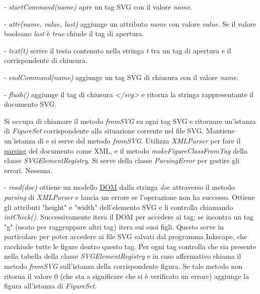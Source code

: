 \begin{elencopuntato}[\subsubsecindent]
\item[-]  \textit{startCommand(name)} apre un tag SVG con il valore \textit{name}. 
\item[-]  \textit{attr(name, value, last)} aggiunge un attributo \textit{name} con valore \textit{value}. Se il valore booleano \textit{last} \`e \textit{true} chiude il tag di apertura.
\item[-]  \textit{text(t)} scrive il testo contenuto nella stringa \textit{t} tra un tag di apertura e il corrispondente di chiusura.
\item[-]  \textit{endCommand(name)} aggiunge un tag SVG di chiusura con il valore \textit{name}.
\item[-]  \textit{flush()} aggiunge il tag di chiusura \textit{</svg>} e ritorna la stringa rappresentante il documento SVG.
\end{elencopuntato}


Si occupa di chiamare il metodo \textit{fromSVG} su ogni tag SVG e ritornare un'istanza di \textit{FigureSet} corrispondente alla situazione corrente nel file SVG.
Mantiene un'istanza di  e si serve del metodo \textit{fromSVG}.
Utilizza \textit{XMLParser} per fare il \underline{parsing} del documento come XML, e il metodo \textit{makeFigureClassFromTag} della classe \textit{SVGElementRegistry}.
Si serve della classe \textit{ParsingError} per gestire gli errori.
Nessuna.
\begin{elencopuntato}[\subsubsecindent]
\item[-]  \textit{read(doc)} ottiene un modello \underline{DOM} dalla stringa \textit{doc} attraverso il metodo \textit{parsing} di \textit{XMLParser} e lancia un errore se l'operazione non ha successo. Ottiene gli attributi "height" e "width" dell'elemento SVG e li controlla chiamando \textit{intCheck()}. Successivamente itera il DOM per accedere ai tag; se incontra un tag "g" (usato per raggruppare altri tag) itera sui suoi figli. Questo serve in particolare per poter accedere ai file SVG salvati dal programma Inkscape, che racchiude tutte le figure dentro questo tag. Per ogni tag controlla che sia presente nella tabella della classe \textit{SVGElementRegistry} e in caso affermativo chiama il metodo \textit{fromSVG} sull'istanza della corrispondente figura. Se tale metodo non ritorna il valore 0 (che sta a significare che si \`e verificato un errore) aggiunge la figura all'istanza di \textit{FigureSet}.
\end{elencopuntato}

